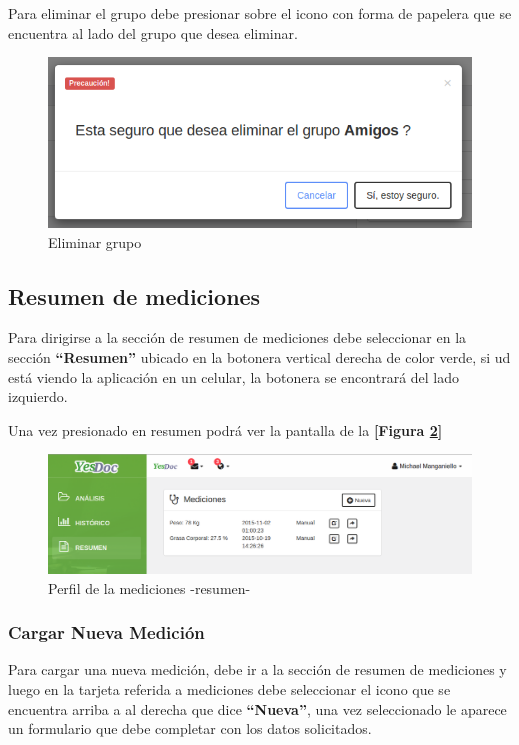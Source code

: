 Para eliminar el grupo debe presionar sobre el icono con forma de papelera que se encuentra al lado del grupo que desea eliminar.
    \begin{figure}
    	\centering
    	\includegraphics[width=.8\textwidth]{img/manual_de_usuario/eliminar_grupo}
    	\caption{Eliminar grupo}
    	\label{mu-eliminar_grupo}
    \end{figure}
    
    
    
    
    
\subsection{Resumen de mediciones}    
Para dirigirse a la sección de resumen de mediciones debe seleccionar en la sección \textbf{``Resumen''} ubicado en la botonera vertical derecha de color verde, si ud está viendo la aplicación en un celular, la botonera se encontrará del lado izquierdo.

Una vez presionado en resumen podrá ver la pantalla de la \textbf{[Figura \ref{mu-resumen_medicion}]}
 

    \begin{figure}
    	\centering
    	\includegraphics[width=.8\textwidth]{img/manual_de_usuario/resumen_medicion}
    	\caption{Perfil de la mediciones -resumen-}
    	\label{mu-resumen_medicion}
    \end{figure}


\subsubsection{Cargar Nueva Medición}
Para cargar una nueva medición, debe ir a la sección de resumen de mediciones y luego en la tarjeta referida a mediciones debe seleccionar el icono que se encuentra arriba a al derecha que dice \textbf{``Nueva''}, una vez seleccionado le aparece un formulario que debe completar con los datos solicitados.

